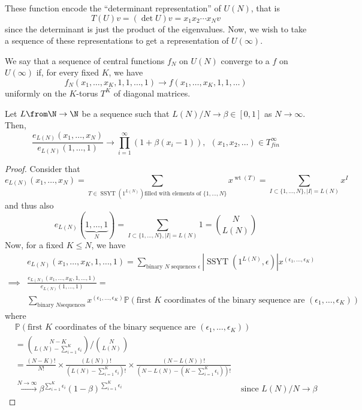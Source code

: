 \documentclass[11pt,leqno,oneside]{amsart}
\numberwithin{thm}{section}
\newcommand{\T}{T} %
\DeclareMathOperator{\SSYT}{SSYT}
\DeclareMathOperator{\wt}{wt}
\renewcommand{\P}{\mathbb{P}} %
\begin{document}
These function encode the ``determinant representation'' of \(U(N)\),
that is \[
  T(U)v = (\det U)v = x_1 x_2 \cdots x_N v
\]
since the determinant is just the product of the eigenvalues. Now, we
wish to take a sequence of these representations to get a
representation of \(U(\infty)\).
\begin{defn}
  We say that a sequence of central functions \(f_N\) on \(U(N)\)
  converge to a  \(f\) on \(U(\infty)\) if, for
  every fixed \(K\), we have \[
    f_N(x_1, \ldots, x_K,1,1, \ldots, 1) \to f(x_1, \ldots, x_K, 1, 1,
    \ldots)
  \]
  uniformly on the \(K\)-torus \(\T^K\) of diagonal matrices. 
\end{defn}
\begin{prop}
  Let \(L \from \N \to \N\) be a sequence such that \(L(N)/N \to \beta
  \in [0,1]\) as \(N \to \infty\). Then, \[
    \frac{e_{L(N)}(x_1, \ldots, x_N)}{e_{L(N)}(1,\ldots,1)} \to
    \prod_{i=1}^\infty (1+\beta(x_i-1)), \ \ (x_1, x_2, \ldots) \in \T^\infty_{fin}
  \]
\end{prop}
\begin{proof}
  Consider that \[
    e_{L(N)}(x_1, \ldots, x_N) = \sum_{T \in \SSYT(1^{L(N)}) \text{filled
        with elements of }\{1, \ldots, N\}} x^{\wt(T)} = \sum_{I \subset \{1,\ldots,N\}, |I| =
    L(N)} x^{I}
  \]
  and thus also \[
    e_{L(N)}(\underbrace{1, \ldots, 1}_{N}) = \sum_{I \subset
      \{1,\ldots,N\}, |I|=L(N)} 1 = \binom{N}{L(N)}
  \]
  Now, for a fixed \(K \leq N\), we have
  \begin{align*}
    & e_{L(N)}(x_1, \ldots, x_K, 1, \ldots, 1)
    = \sum_{\text{binary }N\text{ sequences } \epsilon}
    |\SSYT(1^{L(N)},\epsilon)| x^{(\epsilon_1, \ldots, \epsilon_K)}
     \\
    \implies & \frac{e_{L(N)}(x_1, \ldots, x_K, 1, \ldots,
    1)}{e_{L(N)}(1,\ldots,1)} =\\
    & \sum_{\text{binary }N\text{
    sequences}} x^{(\epsilon_1,\ldots,\epsilon_K)} \P(\text{first
    }K\text{ coordinates of 
    the binary sequence are }(\epsilon_1, \ldots, \epsilon_K))
  \end{align*}
  where
  \begin{align*}
    & \P(\text{first
    }K\text{ coordinates of 
    the binary sequence are }(\epsilon_1, \ldots, \epsilon_K)) \\ & =
  \binom{N-K}{L(N)-\sum_{i=1}^K \epsilon_i} / \binom{N}{L(N)} \\
   & = \frac{(N-K)!}{N!} \times \frac{(L(N))!}{(L(N)-\sum_{i=1}^K
    \epsilon_i)!} \times \frac{(N-L(N))!}{(N-L(N)-(K-\sum_{i=1}^K
     \epsilon_i))!} \\
  & \overset{N \to \infty}{\longrightarrow} \beta^{\sum_{i=1}^K \epsilon_i}
    (1-\beta)^{\sum_{i=1}^K 
    \epsilon_i} & \text{ since } L(N)/N \to \beta
  \end{align*}
\end{proof}
\end{document}
